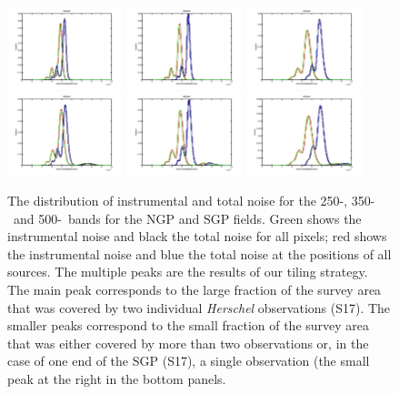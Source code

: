 \documentclass[a4paper,fleqn,usenatbib, twocolumn]{aastex61}
\begin{document}
\begin{figure} %
\includegraphics[width=0.3\textwidth]{flux_noise_250NGP.pdf}
\includegraphics[width=0.3\textwidth]{flux_noise_350NGP.pdf}
\includegraphics[width=0.3\textwidth]{flux_noise_500NGP.pdf}
\includegraphics[width=0.3\textwidth]{flux_noise_250SGP.pdf}
\includegraphics[width=0.3\textwidth]{flux_noise_350SGP.pdf}
\includegraphics[width=0.3\textwidth]{flux_noise_500SGP.pdf}
\caption{The distribution of instrumental and total noise for the
  250-\micron, 350-\micron\ and 500-\micron\  bands for the NGP and SGP
  fields.  Green shows the instrumental noise and black the total
  noise for all pixels; red shows the instrumental noise and blue the
  total noise at the positions of all sources.  The multiple peaks are
  the results of our tiling strategy. The main peak corresponds to the
  large fraction of the survey area that was covered by two individual
  {\it Herschel} observations (S17). The smaller peaks correspond to
  the small fraction of the survey area that was either covered by
  more than two observations or, in the case of one end of the SGP
  (S17), a single observation (the small peak at the right in the
  bottom panels.}
\label{fig_noise}
\end{figure}
\end{document}
